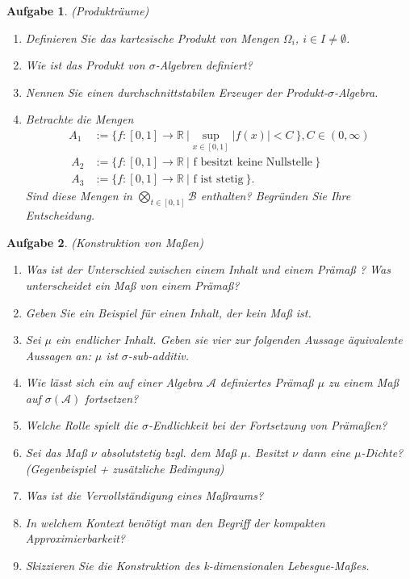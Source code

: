 \documentclass[11pt, a4paper, ngerman]{article}
\newcommand{\R}{\mathbb{R}}
\newtheorem{aufgabe}{Aufgabe}
\begin{document}
\begin{aufgabe} (Produkträume)
    \begin{enumerate}
        \item
        Definieren Sie das kartesische Produkt von Mengen $\Omega_i$, $i \in I \neq \emptyset$. 
        \item
        Wie ist das Produkt von $\sigma$-Algebren definiert?
        \item 
        Nennen Sie einen durchschnittstabilen Erzeuger der Produkt-$\sigma$-Algebra. 
        \item 
        Betrachte die Mengen 
        \begin{align*}
            A_1 &:= \{f:[0,1] \to \R \ \rvert \sup_{x \in [0,1]} \lvert f(x) \rvert < C \ \}, C \in (0,\infty) \\\
            A_2 &:= \{f:[0,1] \to \R \ \rvert \text{ f besitzt keine Nullstelle} \ \} \\\
            A_3 &:= \{f:[0,1] \to \R \ \rvert \text{ f ist stetig} \ \}. 
        \end{align*}
        Sind diese Mengen in $\bigotimes_{t \in [0,1]} \mathcal{B}$ enthalten? Begründen Sie Ihre Entscheidung. 

            

    \end{enumerate}
\end{aufgabe}

\begin{aufgabe} (Konstruktion von Maßen)
   \begin{enumerate}
        \item 
        Was ist der Unterschied zwischen einem Inhalt und einem Prämaß ? Was unterscheidet ein Maß von einem Prämaß?
        \item 
        Geben Sie ein Beispiel für einen Inhalt, der kein Maß ist. 
        \item 
        Sei $\mu$ ein endlicher Inhalt. Geben sie vier zur folgenden Aussage äquivalente Aussagen an: $\mu$ ist $\sigma$-sub-additiv. 
        \item 
        Wie lässt sich ein auf einer Algebra $\mathcal{A}$ definiertes Prämaß $\mu$ zu einem Maß auf $\sigma(\mathcal{A})$ fortsetzen?
        \item 
        Welche Rolle spielt die  $\sigma$-Endlichkeit bei der Fortsetzung von Prämaßen?
        \item 
        Sei das Maß $\nu$ absolutstetig bzgl. dem Maß $\mu$. Besitzt $\nu$ dann eine $\mu$-Dichte?
        (Gegenbeispiel + zusätzliche Bedingung)
        \item 
        Was ist die Vervollständigung eines Maßraums? 
        \item 
        In welchem Kontext benötigt man den Begriff der kompakten Approximierbarkeit?
        \item 
        Skizzieren Sie die Konstruktion des k-dimensionalen Lebesgue-Maßes. 
        
   \end{enumerate}
\end{aufgabe}
\end{document}
